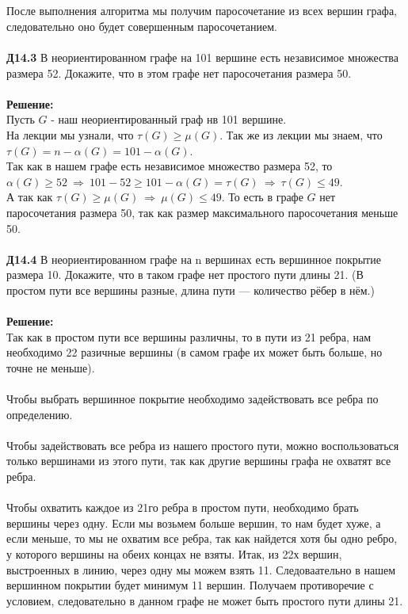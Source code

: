 \documentclass[a4paper, 12pt]{article}
\begin{document}
    \\
    \\ После выполнения алгоритма мы получим паросочетание из всех вершин графа, следовательно оно будет совершенным паросочетанием.
    \\
    \\ \textbf{Д14.3} В неориентированном графе на 101 вершине есть независимое множества размера 52. Докажите,
    что в этом графе нет паросочетания размера 50.
    \\
    \\ \textbf{Решение: }
    \\ Пусть $G$ - наш неориентированный граф нв 101 вершине.
    \\ На лекции мы узнали, что $\tau(G) \geq \mu(G)$. Так же из лекции мы знаем, что $\tau(G) = n - \alpha(G) = 101 - \alpha(G)$.
    \\ Так как в нашем графе есть независимое множество размера 52, то $\alpha(G) \geq 52 \ \Rightarrow \  101 - 52 \geq 101 - \alpha(G) = \tau(G) \ \Rightarrow \ \tau(G) \leq 49$. 
    \\ А так как $\tau(G) \geq \mu(G) \ \Rightarrow \ \mu(G) \leq 49$. То есть в графе $G$ нет паросочетания размера 50, так как размер максимального паросочетания меньше 50.
    \\
    \\ \textbf{Д14.4} В неориентированном графе на n вершинах есть вершинное покрытие размера 10. Докажите,
    что в таком графе нет простого пути длины 21. (В простом пути все вершины разные, длина пути —
    количество рёбер в нём.)
    \\
    \\ \textbf{Решение: }
    \\ Так как в простом пути все вершины различны, то в пути из 21 ребра, нам необходимо 22 разичные вершины (в самом графе их может быть больше, но точне не меньше).
    \\ 
    \\ Чтобы выбрать вершинное покрытие необходимо задействовать все ребра по определению. 
    \\
    \\ Чтобы задействовать все ребра из нашего простого пути, можно воспользоваться только вершинами из этого пути, так как другие вершины графа не охватят все ребра. 
    \\
    \\ Чтобы охватить каждое из 21го ребра в простом пути, необходимо брать вершины через одну. Если мы возьмем больше вершин, то нам будет хуже, а если меньше, то мы не охватим все ребра, так как найдется хотя бы одно ребро, у которого вершины на обеих концах не взяты. Итак, из 22х вершин, выстроенных в линию, через одну мы можем взять 11. Следоваательно в нашем вершинном покрытии будет минимум 11 вершин. Получаем противоречие с условием, следовательно в данном графе не может быть простого пути длины 21.
\end{document}
